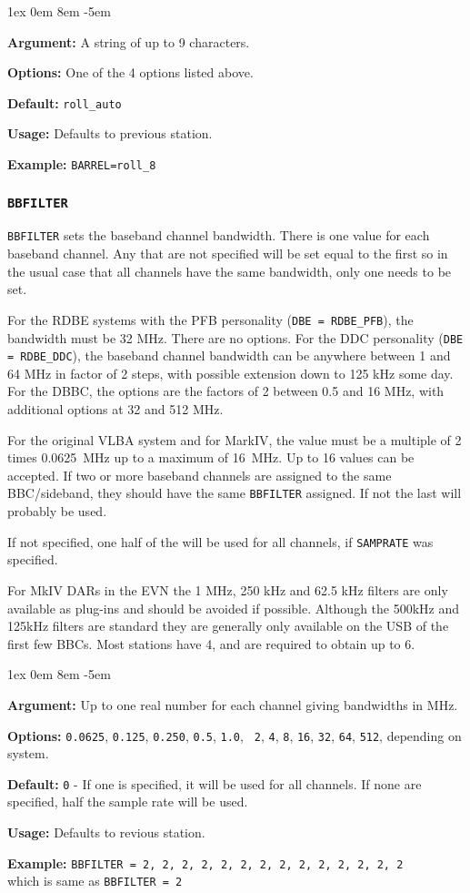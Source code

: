 \documentclass{report}
\newcommand{\rcwbox}[5]{
  \begin{list}{}{\parsep 1ex  \itemsep 0em
                 \leftmargin 8em  \itemindent -5em }
    \item {\bf Argument:} #1
    \item {\bf Options:}  #2
    \item {\bf Default:}  #3
    \item {\bf Usage:}    #4
    \item {\bf Example:}  #5
  \end{list}
}
\begin{document}
\rcwbox
{A string of up to 9 characters.}
{One of the 4 options listed above.}
{{\tt roll\_auto}}
{Defaults to previous station.}
{{\tt BARREL=roll\_8}}

\subsubsection{\label{SP:BBFILTER}{\tt BBFILTER}}

{\tt BBFILTER} sets the baseband channel bandwidth.  There is one
value for each baseband channel.  Any that are not specified will be
set equal to the first so in the usual case that all channels have the
same bandwidth, only one needs to be set.

For the RDBE systems with the PFB personality ({\tt DBE = RDBE\_PFB}),
the bandwidth must be 32 MHz.  There are no options.  For the DDC
personality ({\tt DBE = RDBE\_DDC}), the baseband channel
bandwidth can be anywhere between 1 and 64 MHz in factor of 2
steps, with possible extension down to 125 kHz some day.  For the 
DBBC, the options are the factors of 2 between 0.5
and 16 MHz, with additional options at 32 and 512 MHz.

For the original VLBA system and for MarkIV, the value must be a
multiple of 2 times 0.0625~MHz up to a maximum of 16~MHz. Up to 16
values can be accepted. If two or more baseband channels are assigned
to the same BBC/sideband, they should have the same {\tt BBFILTER}
assigned. If not the last will probably be used.

If not specified, one half of the 
will be used for all channels, if {\tt SAMPRATE} was specified.

For MkIV DARs in the EVN the 1 MHz, 250 kHz and 62.5 kHz filters
are only available as plug-ins and should be avoided if possible.
Although the 500kHz and 125kHz filters are standard they are generally
only available on the USB of the first few BBCs. Most stations have 4,
and are required to obtain up to 6.

\rcwbox
{Up to one real number for each channel giving bandwidths in MHz.}
{{\tt 0.0625}, {\tt 0.125}, {\tt 0.250}, {\tt 0.5}, {\tt 1.0}, {\tt
2}, {\tt 4}, {\tt 8}, {\tt 16}, {\tt 32}, {\tt 64}, {\tt 512},
depending on system.}
{{\tt 0} - If one is specified, it will be used for all channels.
If none are specified, half the sample rate will be used.}
{Defaults to revious station.}
{{\tt BBFILTER = 2, 2, 2, 2, 2, 2, 2, 2, 2, 2, 2, 2, 2, 2} \\ which
is same as {\tt BBFILTER = 2}}
\end{document}
